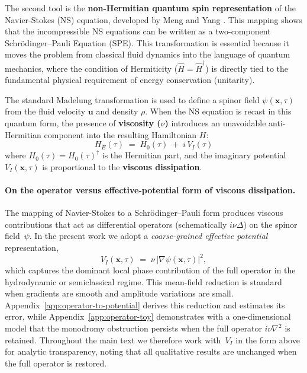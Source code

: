\documentclass[11pt]{article}
\begin{document}
The second tool is the \textbf{non-Hermitian quantum spin representation} of the Navier-Stokes (NS) equation, developed by Meng and Yang \cite{MengYang2024}. This mapping shows that the incompressible NS equations can be written as a two-component Schr\"odinger--Pauli Equation (SPE). This transformation is essential because it moves the problem from classical fluid dynamics into the language of quantum mechanics, where the condition of Hermiticity ($\hat{H} = \hat{H}^\dagger$) is directly tied to the fundamental physical requirement of energy conservation (unitarity).

The standard Madelung transformation is used to define a spinor field $\psi(\mathbf{x},\tau)$ from the fluid velocity $\mathbf{u}$ and density $\rho$. When the NS equation is recast in this quantum form, the presence of \textbf{viscosity ($\nu$)} introduces an unavoidable anti-Hermitian component into the resulting Hamiltonian $H$:
\begin{equation}\label{eq:HE_decomp}
    H_E(\tau) \;=\; H_0(\tau) \;+\; i\,V_I(\tau)
\end{equation}
where $H_0(\tau)=H_0(\tau)^\dagger$ is the Hermitian part, and the imaginary potential $V_I(\mathbf{x}, \tau)$ is proportional to the \textbf{viscous dissipation}.

\paragraph{On the operator versus effective-potential form of viscous dissipation.}
The mapping of Navier-Stokes to a Schr\"odinger--Pauli form produces viscous contributions that act as differential operators (schematically $i\nu\Delta$) on the spinor field~$\psi$.  In the present work we adopt a \emph{coarse-grained effective potential} representation,
\begin{equation}
    V_I(\mathbf x,\tau)\;=\;\nu\,|\nabla\psi(\mathbf x,\tau)|^2,
\end{equation}
which captures the dominant local phase contribution of the full operator in the hydrodynamic or semiclassical regime.  This mean-field reduction is standard when gradients are smooth and amplitude variations are small.  Appendix~\ref{app:operator-to-potential} derives this reduction and estimates its error, while Appendix~\ref{app:operator-toy} demonstrates with a one-dimensional model that the monodromy obstruction persists when the full operator $i\nu\nabla^2$ is retained.  Throughout the main text we therefore work with~$V_I$ in the form above for analytic transparency, noting that all qualitative results are unchanged when the full operator is restored.
\end{document}
